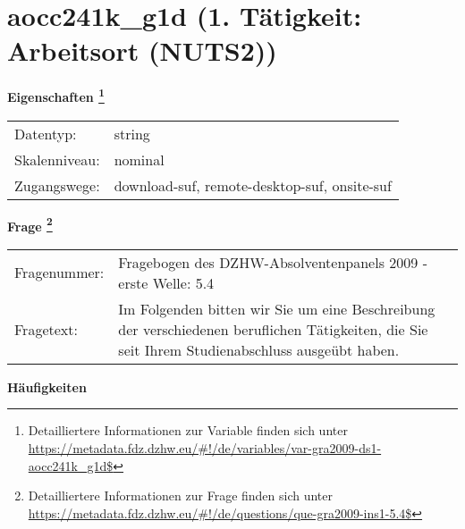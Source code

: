 
    \setcounter{footnote}{0}

    \vspace*{-1.8cm}
	\section{aocc241k\_g1d (1. Tätigkeit: Arbeitsort (NUTS2))}
	\label{section:aocc241k_g1d}



    \vspace*{0.5cm}
    \noindent\textbf{Eigenschaften
	\footnote{Detailliertere Informationen zur Variable finden sich unter
		\url{https://metadata.fdz.dzhw.eu/\#!/de/variables/var-gra2009-ds1-aocc241k_g1d$}}}\\
	\begin{tabularx}{\hsize}{@{}lX}
	Datentyp: & string \\
	Skalenniveau: & nominal \\
	Zugangswege: &
	  download-suf, 
	  remote-desktop-suf, 
	  onsite-suf
 \\
    \end{tabularx}



				\vspace*{0.5cm}
                \noindent\textbf{Frage
	                \footnote{Detailliertere Informationen zur Frage finden sich unter
		              \url{https://metadata.fdz.dzhw.eu/\#!/de/questions/que-gra2009-ins1-5.4$}}}\\
				\begin{tabularx}{\hsize}{@{}lX}
					Fragenummer: &
					  Fragebogen des DZHW-Absolventenpanels 2009 - erste Welle:
					  5.4
 \\
					Fragetext: & Im Folgenden bitten wir Sie um eine Beschreibung der verschiedenen beruflichen Tätigkeiten, die Sie seit Ihrem Studienabschluss ausgeübt haben. \\
				\end{tabularx}





        		\vspace*{0.5cm}
                \noindent\textbf{Häufigkeiten}

